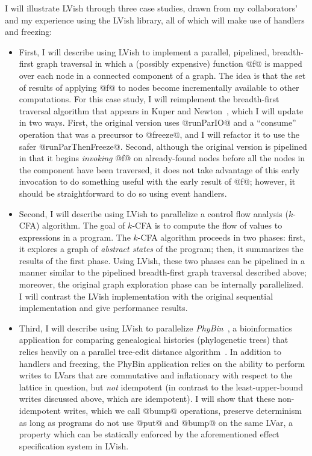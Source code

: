 \documentclass{article}
\begin{document}
I will illustrate LVish through three case studies, drawn from my
collaborators' and my experience using the LVish library, all of which
will make use of handlers and freezing:
\begin{itemize}
\item First, I will describe using LVish to implement a parallel,
  pipelined, breadth-first graph traversal in which a (possibly
  expensive) function @f@ is mapped over each node in a connected
  component of a graph.  The idea is that the set of results of
  applying @f@ to nodes become incrementally available to other
  computations.  For this case study, I will reimplement the
  breadth-first traversal algorithm that appears in Kuper and
  Newton~\cite{LVars-paper}, which I will update in two ways.  First,
  the original version uses @runParIO@ and a ``consume'' operation
  that was a precursor to @freeze@, and I will refactor it to use the
  safer @runParThenFreeze@.  Second, although the original version is
  pipelined in that it begins \emph{invoking} @f@ on already-found
  nodes before all the nodes in the component have been traversed, it
  does not take advantage of this early invocation to do something
  useful with the early result of @f@; however, it should be
  straightforward to do so using event handlers.
\item Second, I will describe using LVish to parallelize a control
  flow analysis ($k$-CFA) algorithm.  The goal of $k$-CFA is to
  compute the flow of values to expressions in a program.  The $k$-CFA
  algorithm proceeds in two phases: first, it explores a graph of
  \emph{abstract states} of the program; then, it summarizes the
  results of the first phase.  Using LVish, these two phases can be
  pipelined in a manner similar to the pipelined breadth-first graph
  traversal described above; moreover, the original graph exploration
  phase can be internally parallelized.  I will contrast the LVish
  implementation with the original sequential implementation and give
  performance results.
\item Third, I will describe using LVish to parallelize
  \emph{PhyBin}~\cite{PhyBin}, a bioinformatics application for
  comparing genealogical histories (phylogenetic trees) that relies
  heavily on a parallel tree-edit distance algorithm~\cite{hashrf}.
  In addition to handlers and freezing, the PhyBin application relies
  on the ability to perform writes to LVars that are commutative and
  inflationary with respect to the lattice in question, but \emph{not}
  idempotent (in contrast to the least-upper-bound writes discussed
  above, which are idempotent).  I will show that these non-idempotent
  writes, which we call @bump@ operations, preserve determinism as
  long as programs do not use @put@ and @bump@ on the same LVar, a
  property which can be statically enforced by the aforementioned
  effect specification system in LVish.
\end{itemize}
\end{document}
